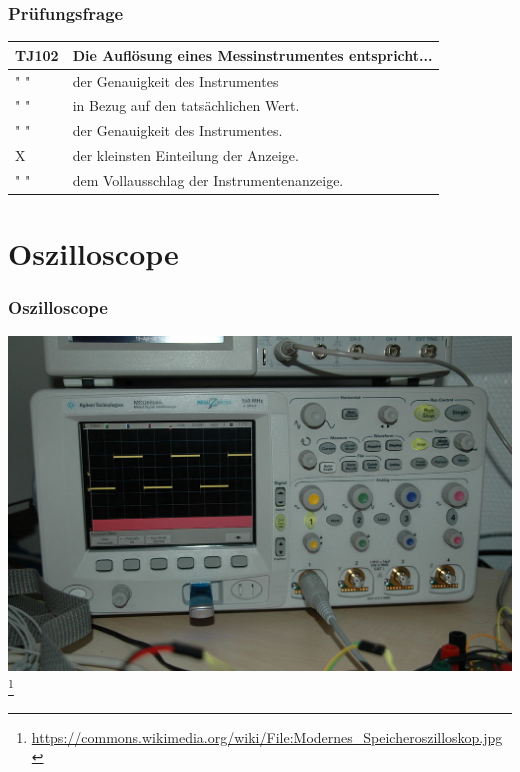 \begin{frame}
    \frametitle{Prüfungsfrage}
    \begin{center}
    \begin{tabular}{l||l}\hline
        TJ102 & Die Auflösung eines Messinstrumentes entspricht... \\ \hline\hline
         " " & der Genauigkeit des Instrumentes \\
         " " & in Bezug auf den tatsächlichen Wert. \\ \hline
         " " & der Genauigkeit des Instrumentes. \\ \hline
         X & der kleinsten Einteilung der Anzeige. \\\hline
         " " & dem Vollausschlag der Instrumentenanzeige. \\\hline
    \end{tabular}
 	\end{center}
\end{frame}

\section*{Oszilloscope}

\begin{frame}
    \frametitle{Oszilloscope}
    \begin{center}
        \includegraphics[width=1\textwidth]{e17/osziModern.jpg}
        \footnote{\tiny \url{https://commons.wikimedia.org/wiki/File:Modernes_Speicheroszilloskop.jpg}}
	\end{center}
\end{frame}

